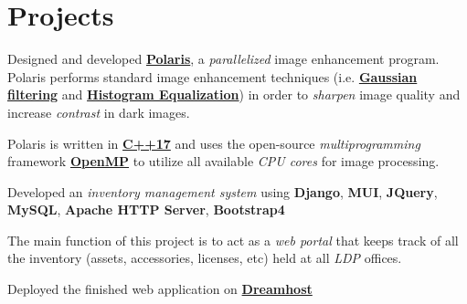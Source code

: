 \documentclass[]{openfont}
\begin{document}
\begin{minipage}[t]{0.65\textwidth}

    \section{Projects}
    \begin{tightemize}
        \item Designed and developed \textbf{\href{https://github.com/OwaisK4/Parallel_Image_Enhancement}{Polaris}}, a \textit{parallelized} image enhancement program. Polaris performs standard image enhancement techniques (i.e. \href{https://en.wikipedia.org/wiki/Gaussian_filter}{\textbf{Gaussian filtering}} and \href{https://en.wikipedia.org/wiki/Histogram_equalization}{\textbf{Histogram Equalization}}) in order to \textit{sharpen} image quality and increase \textit{contrast} in dark images.\\

        \item Polaris is written in \textbf{\href{https://en.cppreference.com/w/cpp/17}{C++17}} and uses the open-source \textit{multiprogramming} framework \textbf{\href{https://www.openmp.org/}{OpenMP}} to utilize all available \textit{CPU cores} for image processing. \\
    \end{tightemize}
    \sectionsep

    \begin{tightemize}
        \item Developed an \textit{inventory management system} using \textbf{Django}, \textbf{MUI}, \textbf{JQuery}, \textbf{MySQL}, \textbf{Apache HTTP Server}, \textbf{Bootstrap4}
        \item The main function of this project is to act as a \textit{web portal} that keeps track of all the inventory (assets, accessories, licenses, etc) held at all \textit{LDP} offices.
        \item Deployed the finished web application on \textbf{\href{https://www.dreamhost.com/}{Dreamhost}}
    \end{tightemize}


\end{minipage}
\end{document}
